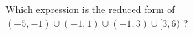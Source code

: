 \documentclass{ximera}
\author{Lee Wayand}
\begin{document}
\begin{exercise}




\begin{question}


Which expression is the reduced form of $(-5, -1) \cup (-1, 1) \cup (-1, 3) \cup [3, 6)$ ?






  \begin{multipleChoice}
  \choice {$(-5, -1) \cup (-1, 3) \cup [3, 6)$}
  \end{multipleChoice}
\end{question}

























\end{exercise}
\end{document}
